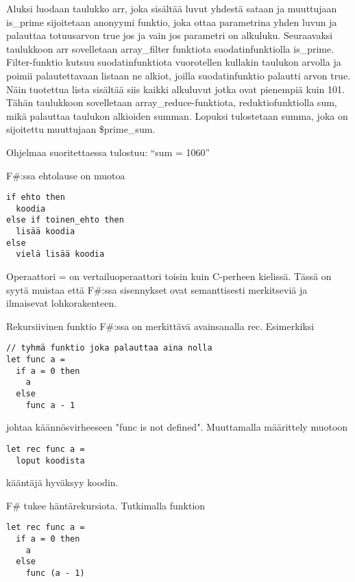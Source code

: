 Aluksi luodaan taulukko arr, joka sisältää luvut yhdestä sataan ja muuttujaan is_prime sijoitetaan anonyymi funktio, joka ottaa parametrina yhden luvun ja palauttaa totuusarvon true jos ja vain jos parametri on alkuluku. Seuraavaksi taulukkoon arr sovelletaan array_filter funktiota suodatinfunktiolla is_prime. Filter-funktio kutsuu suodatinfunktiota vuorotellen kullakin taulukon arvolla ja poimii palautettavaan listaan ne alkiot, joilla suodatinfunktio palautti arvon true. Näin tuotettua lista sisältää siis kaikki alkuluvut jotka ovat pienempiä kuin 101. Tähän taulukkoon sovelletaan array_reduce-funktiota, reduktiofunktiolla sum, mikä palauttaa taulukon alkioiden summan. Lopuksi tulostetaan summa, joka on sijoitettu muuttujaan \$prime_sum. 
\par
Ohjelmaa suoritettaessa tulostuu: “sum = 1060” 

\par

F\#:ssa ehtolause on muotoa

\lstset{
	language=FSharp,
	basicstyle=\ttfamily,
	breaklines=true,
	columns=fullflexible
}

\begin{lstlisting}
if ehto then
  koodia
else if toinen_ehto then
  lisää koodia
else
  vielä lisää koodia
\end{lstlisting}

Operaattori = on vertailuoperaattori toisin kuin C-perheen kielissä. Tässä on syytä muistaa että F\#:ssa sisennykset ovat semanttisesti merkitseviä ja ilmaisevat lohkorakenteen.
\par
Rekursiivinen funktio F\#:ssa on merkittävä avainsanalla rec. Esimerkiksi

\begin{lstlisting}
// tyhmä funktio joka palauttaa aina nolla
let func a =
  if a = 0 then
    a
  else
    func a - 1
\end{lstlisting}

johtaa käännösvirheeseen "func is not defined". Muuttamalla määrittely muotoon

\begin{lstlisting}
let rec func a =
  loput koodista
\end{lstlisting} 
 
kääntäjä hyväksyy koodin.

\par

F\# tukee häntärekursiota. Tutkimalla funktion

\begin{lstlisting}
let rec func a =
  if a = 0 then
    a
  else
    func (a - 1)
\end{lstlisting}
    
